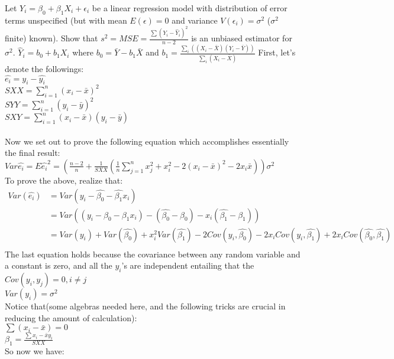 \documentclass[12pt]{article}
\begin{document}
{
Let $Y_i = \beta_0 + \beta_1 X_i + \epsilon_i$ be a linear regression model with distribution of error terms unspecified (but with mean $E(\epsilon) = 0$ and variance $V(\epsilon_i) = \sigma^2$ ($\sigma^2$ finite) known).  Show that $s^2 = MSE = \frac{\sum(Y_i-\hat Y_i)^2}{n-2}$ is an unbiased estimator for $\sigma^2$.  $\hat Y_i = b_0 + b_1 X_i$ where $b_0 = \bar Y - b_1 \bar X$ and $b_1 = \frac{\sum_i((X_i-\bar X)(Y_i - \bar Y))}{\sum_i(X_i-\bar X)}$
}
{
\vfill
  \answer
}
{
First, let's denote the followings:\\
$\hat{e_i}=y_i-\hat{y_i}$\\
$SXX=\displaystyle\sum_{i=1}^n (x_i-\bar{x})^2$\\
$SYY=\displaystyle\sum_{i=1}^n (y_i-\bar{y})^2$\\
$SXY=\displaystyle\sum_{i=1}^n (x_i-\bar{x})(y_i-\bar{y})$\\
\\
Now we set out to prove the following equation which accomplishes
essentially the final result:\\
$Var\hat{e_i}=E\hat{e_i}^2=(\frac{n-2}{n}+\frac{1}{SXX}(\frac{1}{n}\displaystyle\sum_{j=1}^nx_j^2+x_i^2-2(x_i-\bar{x})^2-2x_i\bar{x}))\sigma^2$\\
To prove the above, realize that:\\
\begin{align*}
Var(\hat{e_i})&=Var(y_i-\hat{\beta_0}-\hat{\beta_1}x_i)\\
              &=Var((y_i-\beta_0-\beta_1x_i)-(\hat{\beta_0}-\beta_0)-x_i(\hat{\beta_1}-\beta_1))\\
              &=Var(y_i)+Var(\hat{\beta_0})+x_i^2Var(\hat{\beta_1})-2Cov(y_i,\hat{\beta_0})-2x_iCov(y_i,\hat{\beta_1})+2x_iCov(\hat{\beta_0},\hat{\beta_1})\\
\end{align*}
The last equation holds because the covariance between any random
variable and a constant is zero, and all the $y_i$'s are independent
entailing that the $Cov(y_i,y_j)=0,i\not=j$\\
$Var(y_i)=\sigma^2$\\
Notice that(some algebras needed here, and the following tricks are
crucial in reducing the amount of calculation):\\
$\sum{(x_i-\bar{x})}=0$\\
$\beta_1=\frac{\sum{x_i-\bar{x}}y_i}{SXX}$\\
So now we have:\\
\begin{align*}

\end{align*}}
\end{document}
